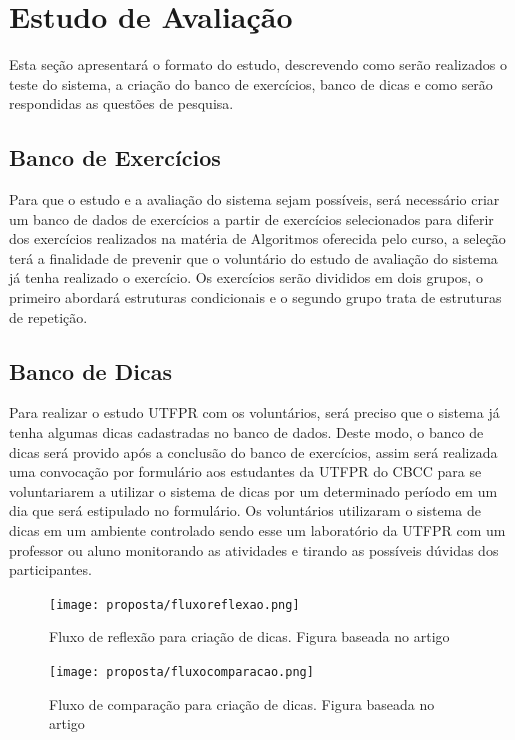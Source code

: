 \section{Estudo de Avaliação}

Esta seção apresentará o formato do estudo, descrevendo como serão realizados o teste do sistema, a criação do banco de exercícios, banco de dicas e como serão respondidas as questões de pesquisa.

\subsection{Banco de Exercícios}

Para que o estudo e a avaliação do sistema sejam possíveis, será necessário criar um banco de dados de exercícios a partir de exercícios selecionados para diferir dos exercícios realizados na matéria de Algoritmos oferecida pelo curso, a seleção terá a finalidade de prevenir que o voluntário do estudo de avaliação do sistema já tenha realizado o exercício. Os exercícios serão divididos em dois grupos, o primeiro abordará estruturas condicionais e o segundo grupo trata de estruturas de repetição.

\subsection{Banco de Dicas}

Para realizar o estudo UTFPR com os voluntários, será preciso que o sistema já tenha algumas dicas cadastradas no banco de dados. Deste modo, o banco de dicas será provido após a conclusão do banco de exercícios, assim será realizada uma convocação por formulário  aos estudantes da UTFPR do CBCC para se voluntariarem a utilizar o sistema de dicas por um determinado período em um dia que será estipulado no formulário. Os voluntários utilizaram o sistema de dicas em um ambiente controlado sendo esse um laboratório da UTFPR com um professor ou aluno monitorando as atividades e tirando as possíveis dúvidas dos participantes. 

\begin{figure}[]
	\centering
	\captionsetup{justification=centering}
	\texttt{[image: proposta/fluxoreflexao.png]}
	\caption{Fluxo de reflexão para criação de dicas. Figura baseada no artigo \cite{Glassman:2016:LPH:2818048.2820011}}
	\label{figura:fluxoreflexao}
\end{figure}

\begin{figure}[]
	\centering
	\captionsetup{justification=centering}
	\texttt{[image: proposta/fluxocomparacao.png]}
	\caption{Fluxo de comparação para criação de dicas. Figura baseada no artigo \cite{Glassman:2016:LPH:2818048.2820011}}
	\label{figura:fluxocomparacao}
\end{figure}

